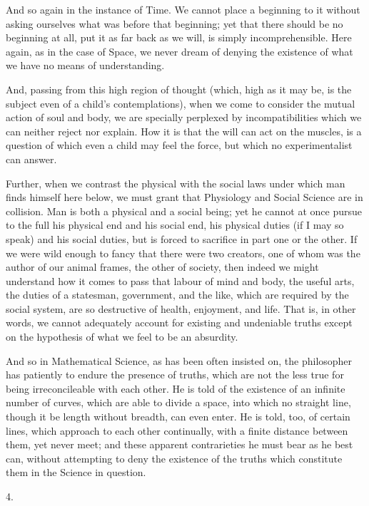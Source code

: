 And so again in the instance of Time. We cannot place a beginning
to it without asking ourselves what was before that beginning; yet
that there should be no beginning at all, put it as far back as we
will, is simply incomprehensible. Here again, as in the case of Space,
we never dream of denying the existence of what we have no means of
understanding.

And, passing from this high region of thought (which, high as it
may be, is the subject even of a child's contemplations), when we come
to consider the mutual action of soul and body, we are specially
perplexed by incompatibilities which we can neither reject nor
explain. How it is that the will can act on the muscles, is a question
of which even a child may feel the force, but which no experimentalist
can answer.

Further, when we contrast the physical with the social laws under
which man finds himself here below, we must grant that Physiology and
Social Science are in collision. Man is both a physical and a social
being; yet he cannot at once pursue to the full his physical end and
his social end, his physical duties (if I may so speak) and his social
duties, but is forced to sacrifice in part one or the other. If we
were wild enough to fancy that there were two creators, one of
whom was the author of our animal frames, the other of society, then
indeed we might understand how it comes to pass that labour of mind
and body, the useful arts, the duties of a statesman, government, and
the like, which are required by the social system, are so destructive
of health, enjoyment, and life. That is, in other words, we cannot
adequately account for existing and undeniable truths except on the
hypothesis of what we feel to be an absurdity.

And so in Mathematical Science, as has been often insisted on, the
philosopher has patiently to endure the presence of truths, which are
not the less true for being irreconcileable with each other. He is
told of the existence of an infinite number of curves, which are able
to divide a space, into which no straight line, though it be length
without breadth, can even enter. He is told, too, of certain lines,
which approach to each other continually, with a finite distance
between them, yet never meet; and these apparent contrarieties he must
bear as he best can, without attempting to deny the existence of the
truths which constitute them in the Science in question.

4.

